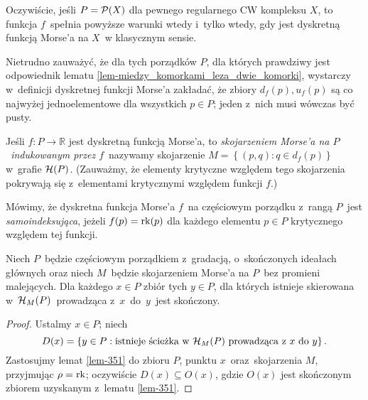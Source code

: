 Oczywiście, jeśli $P=\mathcal{P}(X)$ dla pewnego regularnego CW kompleksu $X$, to funkcja $f$~spełnia powyższe warunki wtedy i~tylko wtedy, gdy jest dyskretną funkcją Morse'a na $X$~w klasycznym sensie. 

Nietrudno zauważyć, że dla tych porządków $P$, dla których prawdziwy jest odpowiednik lematu \ref{lem-miedzy_komorkami_leza_dwie_komorki}, wystarczy w~definicji dyskretnej funkcji Morse'a zakładać, że zbiory $d_f(p),u_f(p)$ są co najwyżej jednoelementowe dla wszystkich $p\in P$; jeden z~nich musi wówczas być pusty.

Jeśli $f\colon P\to \mathbb{R}$ jest dyskretną funkcją Morse'a, to \textit{skojarzeniem Morse'a na $P$~indukowanym przez $f$}~nazywamy skojarzenie $M=\left\{(p,q):q\in d_f(p)\right\}$ w~grafie $\mathcal{H}(P)$. (Zauważmy, że elementy krytyczne względem tego skojarzenia pokrywają się z~elementami krytycznymi względem funkcji $f$.)

Mówimy, że dyskretna funkcja Morse'a $f$~na częściowym porządku z~rangą $P$~jest \textit{samoindeksująca}, jeżeli $f(p)=\operatorname{rk}(p)$ dla każdego elementu $p\in P$  krytycznego względem tej funkcji.

\begin{lem}\label{lem-skonczonosc_zbioru_koncow_wychodzacych_z_wierzcholka_sciezek}
Niech $P$~będzie częściowym porządkiem z~gradacją, o~skończonych ideałach głównych oraz niech $M$~będzie skojarzeniem Morse'a na $P$~bez promieni malejących. Dla każdego $x\in P$ zbiór tych $y\in P$, dla których istnieje skierowana w~$\mathcal{H}_M(P)$~prowadząca z~$x$~do~$y$~jest skończony.
\end{lem}
\begin{proof}
Ustalmy $x\in P$; niech \[D(x)=\left\{y\in P:\text{istnieje ścieżka w } \mathcal{H}_M(P)\text{ prowadząca z } x\text{ do } y\right\}.\]  Zastosujmy lemat \ref{lem-351} do zbioru $P$, punktu $x$~oraz~skojarzenia $M$, przyjmując \mbox{$\rho=\operatorname{rk}$}; oczywiście $D(x)\subseteq O(x)$, gdzie $O(x)$ jest skończonym zbiorem uzyskanym z~lematu \ref{lem-351}.
\begin{comment}
 i~rozważmy podgraf $D(x)\subseteq \mH_M(P)$ indukowany na zbiorze tych $y\in P$, dla których istnieje ścieżka skierowana w~$\mH_M(P)$~prowadząca z~$x$~do~$y$. Udowodnimy, że graf $D(x)$ jest skończony. Rozważmy drzewo $T$~rozpinające ten graf. Liczba krawędzi wychodzących z~każdego wierzchołka grafu $D(x)$ jest skończona, gdyż $P$~ma skończone ideały główne oraz każdy taki wierzchołek znajduje się w~co najwyżej jednej krawędzi należącej do $M$. Zatem drzewo $T$~jest lokalnie skończone. Ponieważ graf $\mH_M(P)$ nie zawiera promieni malejących, $T$~jest, wobec lematu K\"oniga \ref{konig}, drzewem skończonym. Skończony jest zatem również graf $D(X)$.
\end{comment}
\end{proof}

